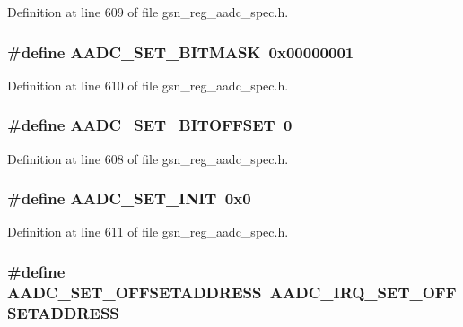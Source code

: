 Definition at line 609 of file gsn\_\-reg\_\-aadc\_\-spec.h.

\hypertarget{a00543_a5a954ba66fbb57615929c20619852c3f}{
\subsubsection[{AADC\_\-SET\_\-BITMASK}]{\setlength{\rightskip}{0pt plus 5cm}\#define AADC\_\-SET\_\-BITMASK~0x00000001}}
\label{a00543_a5a954ba66fbb57615929c20619852c3f}


Definition at line 610 of file gsn\_\-reg\_\-aadc\_\-spec.h.

\hypertarget{a00543_a097cbafbe181c2d7d7c34e419cdfee62}{
\subsubsection[{AADC\_\-SET\_\-BITOFFSET}]{\setlength{\rightskip}{0pt plus 5cm}\#define AADC\_\-SET\_\-BITOFFSET~0}}
\label{a00543_a097cbafbe181c2d7d7c34e419cdfee62}


Definition at line 608 of file gsn\_\-reg\_\-aadc\_\-spec.h.

\hypertarget{a00543_a69e22793d0f5f9e3a53ed668dae76a7e}{
\subsubsection[{AADC\_\-SET\_\-INIT}]{\setlength{\rightskip}{0pt plus 5cm}\#define AADC\_\-SET\_\-INIT~0x0}}
\label{a00543_a69e22793d0f5f9e3a53ed668dae76a7e}


Definition at line 611 of file gsn\_\-reg\_\-aadc\_\-spec.h.

\hypertarget{a00543_aed4a395bf74f43c7320de00d9def32e9}{
\subsubsection[{AADC\_\-SET\_\-OFFSETADDRESS}]{\setlength{\rightskip}{0pt plus 5cm}\#define AADC\_\-SET\_\-OFFSETADDRESS~AADC\_\-IRQ\_\-SET\_\-OFFSETADDRESS}}
\label{a00543_aed4a395bf74f43c7320de00d9def32e9}


